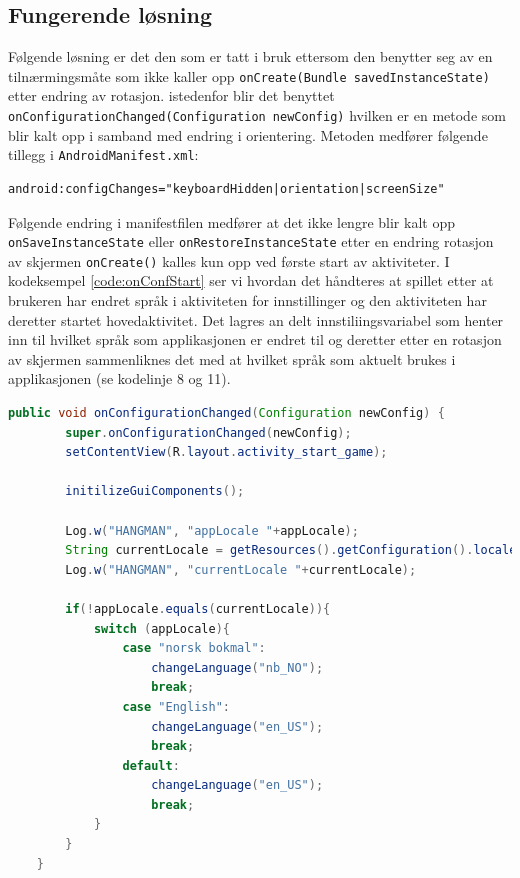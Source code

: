 \subsection{Fungerende løsning}
Følgende løsning er det den som er tatt i bruk ettersom den benytter seg av en tilnærmingsmåte som ikke kaller opp \texttt{onCreate(Bundle savedInstanceState)} etter endring av rotasjon. istedenfor blir det benyttet \texttt{onConfigurationChanged(Configuration newConfig)} hvilken er en metode som blir kalt opp i samband med endring i orientering. Metoden medfører følgende tillegg i \texttt{AndroidManifest.xml}:
\begin{lstlisting}[language=XML]
android:configChanges="keyboardHidden|orientation|screenSize"
\end{lstlisting}
Følgende endring i manifestfilen medfører at det ikke lengre blir kalt opp \texttt{onSaveInstanceState} eller \texttt{onRestoreInstanceState} etter en endring rotasjon av skjermen \texttt{onCreate()} kalles kun opp ved første start av aktiviteter. 
I kodeksempel \ref{code:onConfStart} ser vi hvordan det håndteres at spillet etter at brukeren har endret språk i aktiviteten for innstillinger og den aktiviteten har deretter startet hovedaktivitet. Det lagres an delt innstiliingsvariabel som henter inn til hvilket språk som applikasjonen er endret til og deretter etter en rotasjon av skjermen sammenliknes det med at hvilket språk som aktuelt brukes i applikasjonen (se kodelinje 8 og 11). 

\begin{lstlisting}[language=Java, caption=Håndtering av rotasjon i \texttt{StartGameActivity.java}, label=code:onConfStart]
    public void onConfigurationChanged(Configuration newConfig) {
        super.onConfigurationChanged(newConfig);
        setContentView(R.layout.activity_start_game);

        initilizeGuiComponents();

        Log.w("HANGMAN", "appLocale "+appLocale);
        String currentLocale = getResources().getConfiguration().locale.getDisplayLanguage();
        Log.w("HANGMAN", "currentLocale "+currentLocale);

        if(!appLocale.equals(currentLocale)){
            switch (appLocale){
                case "norsk bokmal":
                    changeLanguage("nb_NO");
                    break;
                case "English":
                    changeLanguage("en_US");
                    break;
                default:
                    changeLanguage("en_US");
                    break;
            }
        }
    }
\end{lstlisting}


